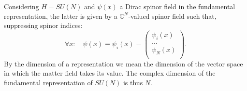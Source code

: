 Considering $H=SU(N)$ and $\psi(x)$ a Dirac spinor field in the fundamental representation, the latter is given by a $\mathbb{C}^N$-valued spinor field such that, suppressing spinor indices:
\begin{equation}
	\forall x:\quad \psi(x) \equiv \psi_i(x) = \begin{pmatrix}
	\psi_i(x) \\
	\dots \\
	\psi_N(x) \\
	\end{pmatrix}.
\end{equation}
By the dimension of a representation we mean the dimension of the vector space in which the matter field takes its value.  The complex dimension of the fundamental representation of $SU(N)$ is thus $N$.
